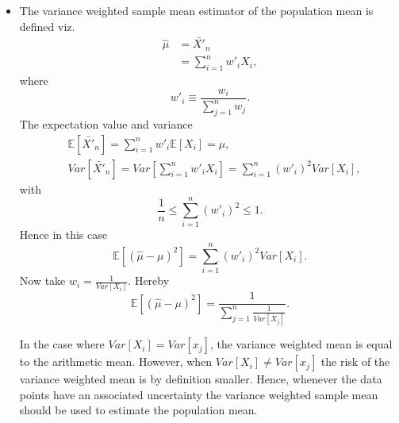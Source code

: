 \begin{example}
\begin{itemize}
		\item The variance weighted sample mean estimator of the population mean is defined viz.
		\begin{equation}
			\begin{split}
				\hat{\mu}&=\bar{X'}_n\\
				&=\sum_{i=1}^{n}w'_iX_i,
			\end{split}
		\end{equation}
		where
		\begin{equation}
			w'_i\equiv \frac{w_i}{\sum_{j=1}^{n}w_j}.
		\end{equation}
		The expectation value and variance 
		\begin{equation}
			\begin{split}
				&\mathbb{E}[\bar{X'}_n]=\sum_{i=1}^{n}w'_i\mathbb{E}[X_i]=\mu,\\
				&Var[\bar{X'}_n]=Var[\sum_{i=1}^{n}w'_iX_i]=\sum_{i=1}^{n}(w'_i)^2Var[X_i],
			\end{split}
		\end{equation}
		with 
		\begin{equation}
			\frac{1}{n}\leq \sum_{i=1}^{n}(w'_i)^2\leq 1.
		\end{equation}
		Hence in this case
		\begin{equation}
			\mathbb{E}[(\hat{\mu}-\mu)^2]=\sum_{i=1}^{n}(w'_i)^2Var[X_i].
		\end{equation}
		Now take $w_i=\frac{1}{Var[X_i]}$. Hereby
		\begin{equation}
			\mathbb{E}[(\hat{\mu}-\mu)^2]=\frac{1}{\sum_{j=1}^{n}\frac{1}{Var[X_j]}}.
		\end{equation}
		
		In the case where $Var[X_i]=Var[x_j]$, the variance weighted mean is equal to the arithmetic mean. However, when $Var[X_i]\neq Var[x_j]$ the risk of the variance weighted mean is by definition smaller. Hence, whenever the data points have an associated uncertainty the variance weighted sample mean should be used to estimate the population mean.	
	\end{itemize}
\end{example}



